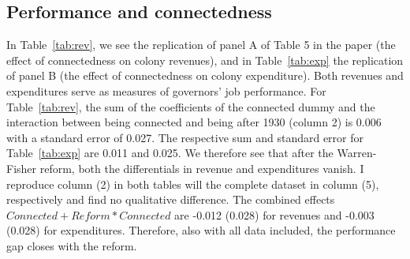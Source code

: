 \documentclass[a4paper]{article}\usepackage[]{graphicx}\usepackage[]{color}
\begin{document}
\subsection{Performance and connectedness}
\hspace*{5mm} In Table~\ref{tab:rev}, we see the replication of panel A of Table 5 in the paper (the effect of connectedness on colony revenues), and in Table~\ref{tab:exp} the replication of panel B (the effect of connectedness on colony expenditure). Both revenues and expenditures serve as measures of governors' job performance. For Table~\ref{tab:rev}, the sum of the coefficients of the connected dummy and the interaction between being connected and being after 1930 (column 2) is 0.006 with a standard error of 0.027. The respective sum and standard error for Table~\ref{tab:exp} are 0.011 and 0.025. We therefore see that after the Warren-Fisher reform, both the differentials in revenue and expenditures vanish. I reproduce column (2) in both tables will the complete dataset in column (5), respectively and find no qualitative difference. The combined effects $Connected + Reform*Connected$ are -0.012 (0.028) for revenues and -0.003 (0.028) for expenditures. Therefore, also with all data included, the performance gap closes with the reform.
\end{document}
